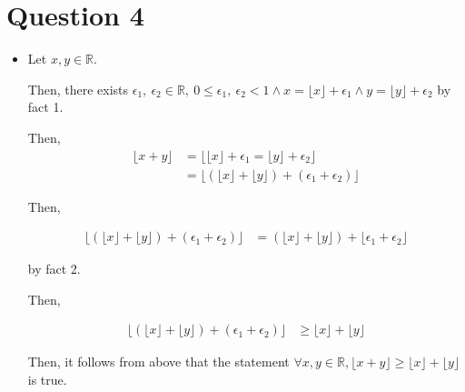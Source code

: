 \documentclass[12pt]{article}
\begin{document}
\section*{Question 4}
\begin{itemize}
    \item

    Let $x,y \in \mathbb{R}$.

    \bigskip

    Then, there exists $\epsilon_1,\:\epsilon_2 \in \mathbb{R},\:0 \leq
    \epsilon_1,\:\epsilon_2 < 1 \land x = \lfloor x \rfloor + \epsilon_1 \land y =
    \lfloor y \rfloor + \epsilon_2$ by fact 1.

    \bigskip

    Then,
    \setcounter{equation}{0}
    \begin{align}
        \lfloor x + y \rfloor &= \Big\lfloor \lfloor x \rfloor + \epsilon_1 = \lfloor y \rfloor + \epsilon_2 \Big\rfloor\\
        &= \Big\lfloor (\lfloor x \rfloor + \lfloor y \rfloor) + (\epsilon_1 + \epsilon_2) \Big\rfloor
    \end{align}

    \bigskip

    Then,

    \begin{align}
        \Big\lfloor (\lfloor x \rfloor + \lfloor y \rfloor) + (\epsilon_1 + \epsilon_2) \Big\rfloor &= (\lfloor x \rfloor + \lfloor y \rfloor) + \Big\lfloor \epsilon_1 + \epsilon_2 \Big\rfloor
    \end{align}

    by fact 2.

    \bigskip

    Then,

    \begin{align}
        \Big\lfloor (\lfloor x \rfloor + \lfloor y \rfloor) + (\epsilon_1 + \epsilon_2) \Big\rfloor &\geq \lfloor x \rfloor + \lfloor y \rfloor
    \end{align}

    \bigskip

    Then, it follows from above that the statement $\forall x,y\in \mathbb{R}, \lfloor x + y
    \rfloor \geq \lfloor x \rfloor + \lfloor y \rfloor$ is true.


\end{itemize}
\end{document}
